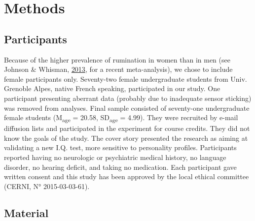 \documentclass[a4paper,12pt,twoside,openright,oldfontcommands]{memoir}
\begin{document}
\section{Methods}\label{methods}

\subsection{Participants}\label{participants}

Because of the higher prevalence of rumination in women than in men (see
Johnson \& Whisman, \protect\hyperlink{ref-Johnson2013}{2013}, for a
recent meta-analysis), we chose to include female participants only.
Seventy-two female undergraduate students from Univ. Grenoble Alpes,
native French speaking, participated in our study. One participant
presenting aberrant data (probably due to inadequate sensor sticking)
was removed from analyses. Final sample consisted of seventy-one
undergraduate female students (M\textsubscript{age} = 20.58,
SD\textsubscript{age} = 4.99). They were recruited by e-mail diffusion
lists and participated in the experiment for course credits. They did
not know the goals of the study. The cover story presented the research
as aiming at validating a new I.Q. test, more sensitive to personality
profiles. Participants reported having no neurologic or psychiatric
medical history, no language disorder, no hearing deficit, and taking no
medication. Each participant gave written consent and this study has
been approved by the local ethical committee (CERNI, N° 2015-03-03-61).

\subsection{Material}\label{material}
\end{document}
